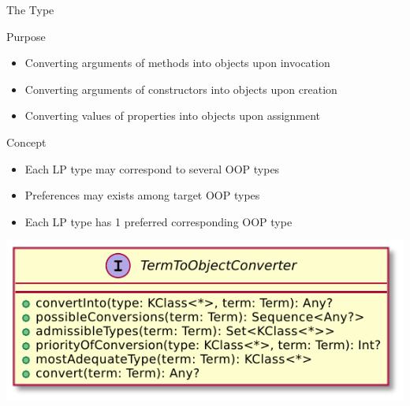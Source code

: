 \documentclass[handout]{beamer}
\begin{document}
\begin{frame}[allowframebreaks]{The  Type}
    \begin{block}{Purpose}
        \begin{itemize}
            \item Converting \alert{arguments} of methods into objects upon \alert{invocation}
            \item Converting \alert{arguments} of constructors into objects upon \alert{creation}
            \item Converting \alert{values} of properties into objects upon \alert{assignment}
        \end{itemize}
    \end{block}

    \begin{alertblock}{Concept}
        \begin{itemize}
            \item Each LP type may correspond to several OOP types
            \item Preferences may exists among target OOP types
            \item Each LP type has 1 preferred corresponding OOP type
        \end{itemize}
    \end{alertblock}

    \framebreak

    \begin{center}
        \includegraphics[width=.6\linewidth]{img/TermToObjectConverter.pdf}
    \end{center}

    \framebreak

    
\end{frame}
\end{document}
